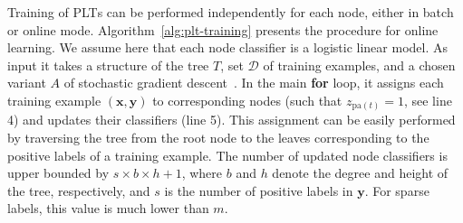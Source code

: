 \documentclass{article}
\newcommand{\Algo}[1]{\textsc{#1}}
\renewcommand{\vec}[1]{\boldsymbol{#1}}
\newcommand{\bx}{\vec{x}}
\newcommand{\by}{\vec{y}}
\newcommand{\calD}{\mathcal{D}}
\newcommand{\heta}{\hat{\eta}}
\newcommand{\pa}[1]{\mathrm{pa}(#1)}
\begin{document}
Training of \Algo{PLT}s can be performed independently for each node, either in batch or online mode.  Algorithm~\ref{alg:plt-training} presents the procedure for online learning. We assume here that each node classifier is a logistic linear model. As input it takes a structure of the tree $T$, set $\calD$ of training examples, and a chosen variant $A$ of stochastic gradient descent~\cite{Bottou_2010}. In the main \textbf{for} loop, it assigns each training example $(\bx, \by)$ to corresponding nodes (such that  $z_{\pa{t}} = 1$, see line 4) and updates their classifiers (line 5). This assignment can be easily performed by traversing the tree from the root node to the leaves corresponding to the positive labels of a training example. The number of updated node classifiers is upper bounded by $s \times b \times h+1$, where $b$ and $h$ denote the degree and height of the tree, respectively, and $s$ is the number of positive labels in $\by$. For sparse labels, this value is much lower than $m$.





\end{document}
